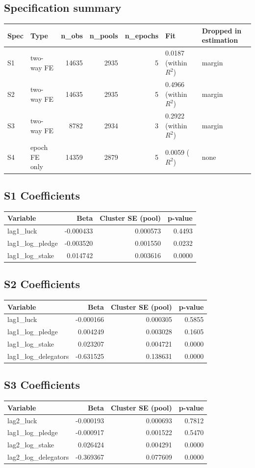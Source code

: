 \documentclass[11pt]{article}
\begin{document}
\subsection*{Specification summary}
\begin{longtable}{l l r r r l p{3.2cm}}
\toprule
Spec & Type & n\_obs & n\_pools & n\_epochs & Fit & Dropped in estimation \\
\midrule
\endhead
S1 & two-way FE & 14635 & 2935 & 5 & 0.0187 (within $R^2$) & margin \\
S2 & two-way FE & 14635 & 2935 & 5 & 0.4966 (within $R^2$) & margin \\
S3 & two-way FE & 8782 & 2934 & 3 & 0.2922 (within $R^2$) & margin \\
S4 & epoch FE only & 14359 & 2879 & 5 & 0.0059 ($R^2$) & none \\
\bottomrule
\end{longtable}
\subsection*{S1 Coefficients}
\begin{longtable}{l r r r}
\toprule
Variable & Beta & Cluster SE (pool) & p-value \\
\midrule
\endhead
lag1\_luck & -0.000433 & 0.000573 & 0.4493 \\
lag1\_log\_pledge & -0.003520 & 0.001550 & 0.0232 \\
lag1\_log\_stake & 0.014742 & 0.003616 & 0.0000 \\
\bottomrule
\end{longtable}
\subsection*{S2 Coefficients}
\begin{longtable}{l r r r}
\toprule
Variable & Beta & Cluster SE (pool) & p-value \\
\midrule
\endhead
lag1\_luck & -0.000166 & 0.000305 & 0.5855 \\
lag1\_log\_pledge & 0.004249 & 0.003028 & 0.1605 \\
lag1\_log\_stake & 0.023207 & 0.004721 & 0.0000 \\
lag1\_log\_delegators & -0.631525 & 0.138631 & 0.0000 \\
\bottomrule
\end{longtable}
\subsection*{S3 Coefficients}
\begin{longtable}{l r r r}
\toprule
Variable & Beta & Cluster SE (pool) & p-value \\
\midrule
\endhead
lag2\_luck & -0.000193 & 0.000693 & 0.7812 \\
lag1\_log\_pledge & -0.000917 & 0.001522 & 0.5470 \\
lag2\_log\_stake & 0.026424 & 0.004291 & 0.0000 \\
lag2\_log\_delegators & -0.369367 & 0.077609 & 0.0000 \\
\bottomrule
\end{longtable}
\end{document}
